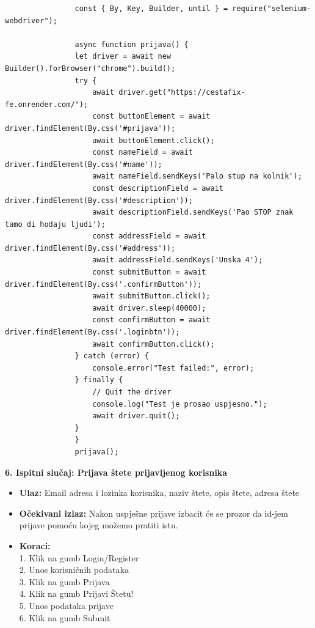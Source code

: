 			\begin{verbatim}
				const { By, Key, Builder, until } = require("selenium-webdriver");

				async function prijava() {
				let driver = await new Builder().forBrowser("chrome").build();
				try {
					await driver.get("https://cestafix-fe.onrender.com/");
					const buttonElement = await driver.findElement(By.css('#prijava'));
					await buttonElement.click();
					const nameField = await driver.findElement(By.css('#name'));
					await nameField.sendKeys('Palo stup na kolnik');
					const descriptionField = await driver.findElement(By.css('#description'));
					await descriptionField.sendKeys('Pao STOP znak tamo di hodaju ljudi');
					const addressField = await driver.findElement(By.css('#address'));
					await addressField.sendKeys('Unska 4');
					const submitButton = await driver.findElement(By.css('.confirmButton'));
					await submitButton.click();
					await driver.sleep(40000);
					const confirmButton = await driver.findElement(By.css('.loginbtn'));
					await confirmButton.click();
				} catch (error) {
					console.error("Test failed:", error);
				} finally {
					// Quit the driver
					console.log("Test je prosao uspjesno.");
					await driver.quit();
				}
				}
				prijava();
			\end{verbatim}


			\textbf{6. Ispitni slučaj: Prijava štete prijavljenog korisnika}
			 \begin{itemize}
				\item \textbf{Ulaz:} Email adresa i lozinka korisnika, naziv štete, opis štete, adresa štete
				\item \textbf{Očekivani izlaz:} Nakon uspješne prijave izbacit će se prozor da id-jem prijave pomoću kojeg možemo pratiti istu.
				\item \textbf{Koraci:} 
				\\ 1. Klik na gumb Login/Register
				\\ 2. Unos korisničnih podataka
				\\ 3. Klik na gumb Prijava
				\\ 4. Klik na gumb Prijavi Štetu!
				\\ 5. Unos podataka prijave
				\\ 6. Klik na gumb Submit
			\end{itemize}

